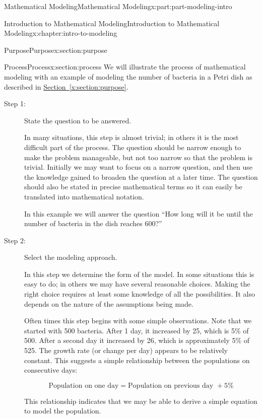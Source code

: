\documentclass[oneside,10pt,]{book}
\newcommand{\xreffont}{\relax}
\numberwithin{equation}{section}
\begin{document}
\begin{partptx}{Mathematical Modeling}{}{Mathematical Modeling}{}{}{x:part:part-modeling-intro}
\begin{chapterptx}{Introduction to Mathematical Modeling}{}{Introduction to Mathematical Modeling}{}{}{x:chapter:intro-to-modeling}
\begin{sectionptx}{Purpose}{}{Purpose}{}{}{x:section:purpose}
\end{sectionptx}
%
%
\typeout{************************************************}
\typeout{************************************************}
%
\begin{sectionptx}{Process}{}{Process}{}{}{x:section:process}
We will illustrate the process of mathematical modeling with an example of modeling the number of bacteria in a Petri dish as described in \hyperref[x:section:purpose]{Section~{\xreffont\ref{x:section:purpose}}}.%
\par
%
\begin{description}
\item[{Step 1:}]State the question to be answered.%
\par
In many situations, this step is almost trivial; in others it is the most difficult part of the process. The question should be narrow enough to make the problem manageable, but not too narrow so that the problem is trivial. Initially we may want to focus on a narrow question, and then use the knowledge gained to broaden the question at a later time. The question should also be stated in precise mathematical terms so it can easily be translated into mathematical notation.%
\par
In this example we will answer the question “How long will it be until the number of bacteria in the dish reaches 600?”%
\item[{Step 2:}]Select the modeling approach.%
\par
In this step we determine the form of the model. In some situations this is easy to do; in others we may have several reasonable choices. Making the right choice requires at least some knowledge of all the possibilities. It also depends on the nature of the assumptions being made.%
\par
Often times this step begins with some simple observations. Note that we started with 500 bacteria. After 1 day, it increased by 25, which is 5\% of 500. After a second day it increased by 26, which is approximately 5\% of 525. The growth rate (or change per day) appears to be relatively constant. This suggests a simple relationship between the populations on consecutive days:%
\par
%
\begin{equation*}
\text{Population on one day}=\text{Population on previous day } + 5\%
\end{equation*}
%
\par
This relationship indicates that we may be able to derive a simple equation to model the population.%

\end{description}
\end{sectionptx}
\end{chapterptx}
\end{partptx}
\end{document}
